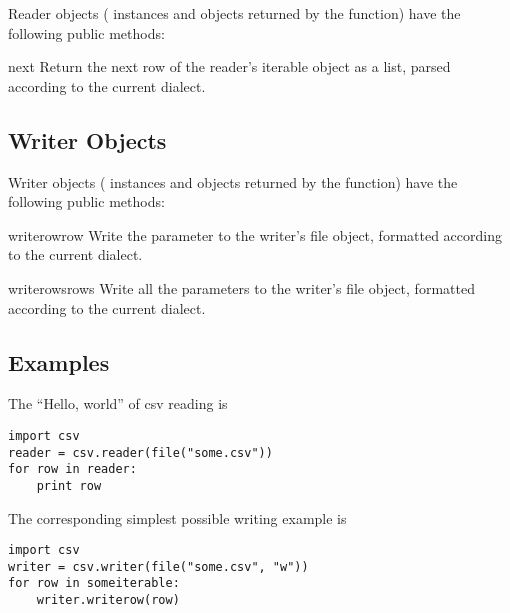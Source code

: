 Reader objects ( instances and objects returned by
the  function) have the following public methods:

\begin{methoddesc}{next}{}
Return the next row of the reader's iterable object as a list, parsed
according to the current dialect.
\end{methoddesc}


\subsection{Writer Objects}

Writer objects ( instances and objects returned by
the  function) have the following public methods:

\begin{methoddesc}{writerow}{row}
Write the  parameter to the writer's file object, formatted
according to the current dialect.
\end{methoddesc}

\begin{methoddesc}{writerows}{rows}
Write all the  parameters to the writer's file object, formatted
according to the current dialect.
\end{methoddesc}


\subsection{Examples}

The ``Hello, world'' of csv reading is

\begin{verbatim}
import csv
reader = csv.reader(file("some.csv"))
for row in reader:
    print row
\end{verbatim}

The corresponding simplest possible writing example is

\begin{verbatim}
import csv
writer = csv.writer(file("some.csv", "w"))
for row in someiterable:
    writer.writerow(row)
\end{verbatim}
